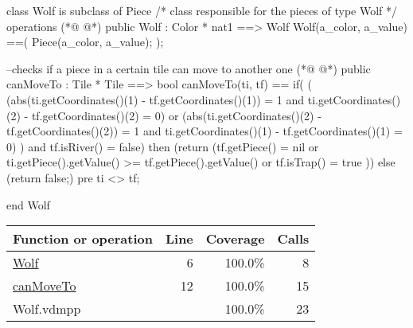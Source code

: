 \begin{vdmpp}[breaklines=true]
class Wolf is subclass of Piece
/*
class responsible for the pieces of type Wolf
*/
operations
(*@
\label{Wolf:6}
@*)
 public Wolf : Color * nat1 ==> Wolf
   Wolf(a_color, a_value) ==(
    Piece(a_color, a_value);
   );
   
--checks if a piece in a certain tile can move to another one
(*@
\label{canMoveTo:12}
@*)
 public canMoveTo : Tile * Tile  ==> bool
 canMoveTo(ti, tf) 
  ==  if(
       (
       (abs(ti.getCoordinates()(1) - tf.getCoordinates()(1)) = 1 and ti.getCoordinates()(2) - tf.getCoordinates()(2) = 0) or 
       (abs(ti.getCoordinates()(2) - tf.getCoordinates()(2)) = 1 and ti.getCoordinates()(1) - tf.getCoordinates()(1) = 0)
       ) 
      and tf.isRiver() = false)
       then (return (tf.getPiece() = nil or ti.getPiece().getValue() >= tf.getPiece().getValue() or tf.isTrap() = true )) 
    else (return false;)
 pre ti <> tf;

end Wolf
\end{vdmpp}
\bigskip
\begin{longtable}{|l|r|r|r|}
\hline
Function or operation & Line & Coverage & Calls \\
\hline
\hline
\hyperref[Wolf:6]{Wolf} & 6&100.0\% & 8 \\
\hline
\hyperref[canMoveTo:12]{canMoveTo} & 12&100.0\% & 15 \\
\hline
\hline
Wolf.vdmpp & & 100.0\% & 23 \\
\hline
\end{longtable}

